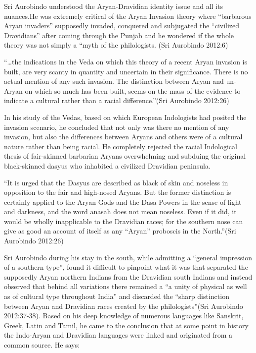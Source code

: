 Sri Aurobindo understood the Aryan-Dravidian identity issue and all its nuances.He was extremely critical of the Aryan Invasion theory where “barbarous Aryan invaders” supposedly invaded, conquered and subjugated the “civilized Dravidians” after coming through the Punjab and he wondered if the whole theory was not simply a “myth of the philologists. (Sri Aurobindo 2012:6)

\begin{myquote}
“…the indications in the Veda on which this theory of a recent Aryan invasion is built, are very scanty in quantity and uncertain in their significance. There is no actual mention of any such invasion. The distinction between Aryan and un-Aryan on which so much has been built, seems on the mass of the evidence to indicate a cultural rather than a racial difference.”(Sri Aurobindo 2012:26)
\end{myquote}

In his study of the Vedas, based on which European Indologists had posited the invasion scenario, he concluded that not only was there no mention of any invasion, but also the differences between Aryans and others were of a cultural nature rather than being racial. He completely rejected the racial Indological thesis of fair-skinned barbarian Aryans overwhelming and subduing the original black-skinned dasyus who inhabited a civilized Dravidian peninsula.

\begin{myquote}
“It is urged that the Dasyus are described as black of skin and noseless in opposition to the fair and high-nosed Aryans. But the former distinction is certainly applied to the Aryan Gods and the Dasa Powers in the sense of light and darkness, and the word anāsah does not mean noseless. Even if it did, it would be wholly inapplicable to the Dravidian races; for the southern nose can give as good an account of itself as any “Aryan” proboscis in the North.”(Sri Aurobindo 2012:26)
\end{myquote}

Sri Aurobindo during his stay in the south, while admitting a “general impression of a southern type”, found it difficult to pinpoint what it was that separated the supposedly Aryan northern Indians from the Dravidian south Indians and instead observed that behind all variations there remained a “a unity of physical as well as of cultural type throughout India” and discarded the “sharp distinction between Aryan and Dravidian races created by the philologists”(Sri Aurobindo 2012:37-38). Based on his deep knowledge of numerous languages like Sanskrit, Greek, Latin and Tamil, he came to the conclusion that at some point in history the Indo-Aryan and Dravidian languages were linked and originated from a common source. He says:

